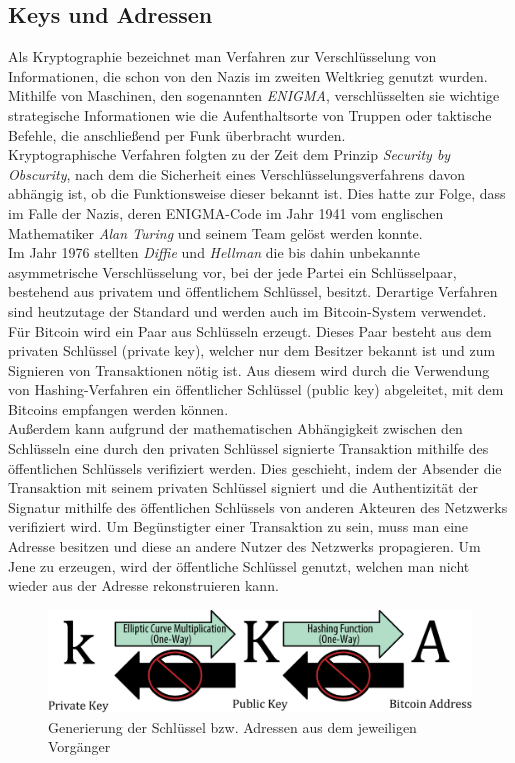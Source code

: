 \subsection{Keys und Adressen}
Als Kryptographie bezeichnet man Verfahren zur Verschlüsselung von Informationen, die schon von den Nazis im zweiten Weltkrieg genutzt wurden. 
Mithilfe von Maschinen, den sogenannten \emph{ENIGMA}, verschlüsselten sie wichtige strategische Informationen wie die Aufenthaltsorte von Truppen oder taktische Befehle, die anschließend per Funk überbracht wurden.\\
Kryptographische Verfahren folgten zu der Zeit dem Prinzip \emph{Security by Obscurity}, nach dem die Sicherheit eines Verschlüsselungsverfahrens davon abhängig ist, ob die Funktionsweise dieser bekannt ist. 
Dies hatte zur Folge, dass im Falle der Nazis, deren ENIGMA-Code im Jahr 1941 vom englischen Mathematiker \emph{Alan Turing} und seinem Team gelöst werden konnte.\\
Im Jahr 1976 stellten \emph{Diffie} und \emph{Hellman} die bis dahin unbekannte asymmetrische Verschlüsselung vor, bei der jede Partei ein Schlüsselpaar, bestehend aus privatem und öffentlichem Schlüssel, besitzt. 
Derartige Verfahren sind heutzutage der Standard und werden auch im Bitcoin-System verwendet.\\
Für Bitcoin wird ein Paar aus Schlüsseln erzeugt. 
Dieses Paar besteht aus dem privaten Schlüssel (private key), welcher nur dem Besitzer bekannt ist und zum Signieren von Transaktionen nötig ist.
Aus diesem wird durch die Verwendung von Hashing-Verfahren ein öffentlicher Schlüssel (public key) abgeleitet, mit dem Bitcoins empfangen werden können.\\
Außerdem kann aufgrund der mathematischen Abhängigkeit zwischen den Schlüsseln eine durch den privaten Schlüssel signierte Transaktion mithilfe des öffentlichen Schlüssels verifiziert werden. Dies geschieht, indem der Absender die Transaktion mit seinem privaten Schlüssel signiert und die Authentizität der Signatur mithilfe des öffentlichen Schlüssels von anderen Akteuren des Netzwerks verifiziert wird. Um Begünstigter einer Transaktion zu sein, muss man eine Adresse besitzen und diese an andere Nutzer des Netzwerks propagieren. Um Jene zu erzeugen, wird der öffentliche Schlüssel genutzt, welchen man nicht wieder aus der Adresse rekonstruieren kann.\\
\begin{figure}[htpb]
	\centering
	\includegraphics[width=\textwidth]{images/public_and_private_key.png}
	\caption{Generierung der Schlüssel bzw. Adressen aus dem jeweiligen Vorgänger}
	\label{6braun:fig:keys}
\end{figure}
